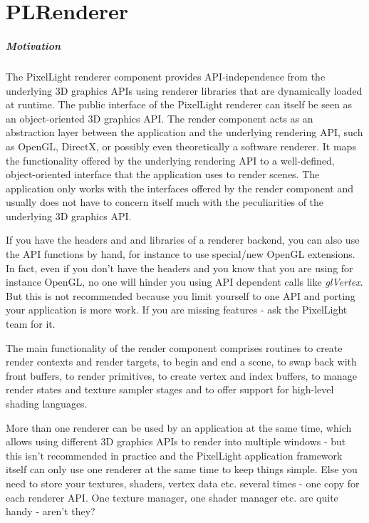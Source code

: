 \chapter{PLRenderer}


\paragraph{Motivation}
The PixelLight renderer component provides API-independence from the underlying 3D graphics APIs using renderer libraries that are dynamically loaded at runtime. The public interface of the PixelLight renderer can itself be seen as an object-oriented 3D graphics API. The render component acts as an abstraction layer between the application and the underlying rendering API, such as OpenGL, DirectX, or possibly even theoretically a software renderer. It maps the functionality offered by the underlying rendering API to a well-defined, object-oriented interface that the application uses to render scenes. The application only works with the interfaces offered by the render component and usually does not have to concern itself much with the peculiarities of the underlying 3D graphics API.

If you have the headers and and libraries of a renderer backend, you can also use the API functions by hand, for instance to use special/new OpenGL extensions. In fact, even if you don't have the headers and you know that you are using for instance OpenGL, no one will hinder you using API dependent calls like \emph{glVertex}. But this is not recommended because you limit yourself to one API and porting your application is more work. If you are missing features - ask the PixelLight team for it.

The main functionality of the render component comprises routines to create render contexts and render targets, to begin and end a scene, to swap back with front buffers, to render primitives, to create vertex and index buffers, to manage render states and texture sampler stages and to offer support for high-level shading languages.

More than one renderer can be used by an application at the same time, which allows using different 3D graphics APIs to render into multiple windows - but this isn't recommended in practice and the PixelLight application framework itself can only use one renderer at the same time to keep things simple. Else you need to store your textures, shaders, vertex data etc. several times - one copy for each renderer API. One texture manager, one shader manager etc. are quite handy - aren't they?

